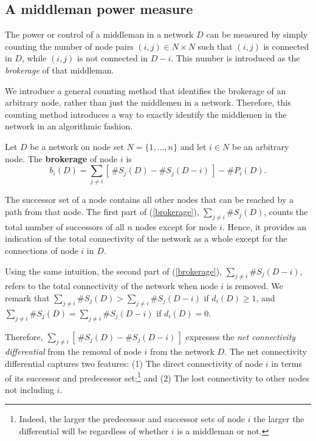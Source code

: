 \subsection{A middleman power measure}

The power or control of a middleman in a network $D$ can be measured by simply counting the number of node pairs $(i,j) \in N \times N$ such that $(i,j)$ is connected in $D$, while $(i,j)$ is not connected in $D-i$. This number is introduced as the \emph{brokerage} of that middleman.

We introduce a general counting method that identifies the brokerage of an arbitrary node, rather than just the middlemen in a network. Therefore, this counting method introduces a way to exactly identify the middlemen in the network in an algorithmic fashion.

\begin{definition}
	Let $D$ be a network on node set $N = \{1, \ldots ,n\}$ and let $i \in N$ be an arbitrary node. The \textbf{brokerage} of node $i$ is
	\begin{equation} \label{brokerage}
		b_{i}(D) = \sum_{j \neq i} \left[ \, \# S_{j}(D) - \# S_{j}(D - i) \, \right] - \#P_{i}(D) .
	\end{equation}
\end{definition}

\noindent
The successor set of a node contains all other nodes that can be reached by a path from that node. The first part of (\ref{brokerage}), $\sum_{j \neq i} \# S_{j}(D)$, counts the total number of successors of all $n$ nodes except for node $i$. Hence, it provides an indication of the total connectivity of the network as a whole except for the connections of node $i$ in $D$.

Using the same intuition, the second part of (\ref{brokerage}), $\sum_{j \neq i} \# S_{j}(D - i)$, refers to the total connectivity of the network when node $i$ is removed. We remark that $\sum_{j \neq i} \# S_{j}(D) > \sum_{j \neq i} \# S_{j}(D - i)$ if $d_{i}(D) \geqslant 1$, and $\sum_{j \neq i} \# S_{j}(D) = \sum_{j \neq i} \# S_{j}(D - i)$ if $d_{i} (D) = 0$.

Therefore, $\sum_{j \neq i} \left[ \, \# S_{j}(D) - \# S_{j}(D - i) \, \right]$ expresses the \emph{net connectivity differential} from the removal of node $i$ from the network $D$. The net connectivity differential captures two features: (1) The direct connectivity of node $i$ in terms of its successor and predecessor set;\footnote{Indeed, the larger the predecessor and successor sets of node $i$ the larger the differential will be regardless of whether $i$ is a middleman or not.} and (2) The lost connectivity to other nodes not including $i$.


